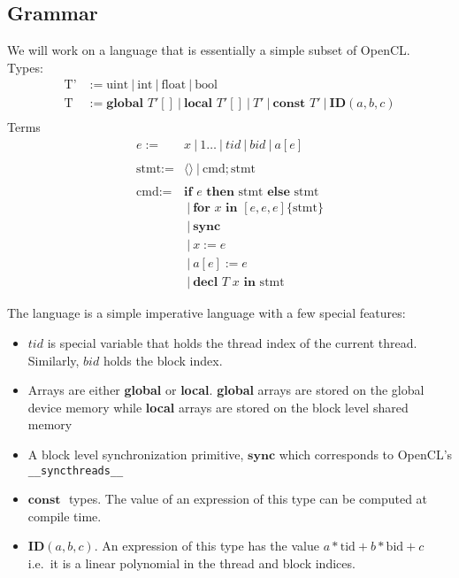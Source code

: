 \documentclass{article}
\newcommand{\nil}{\langle\rangle}
\newcommand{\Global}{\textbf{global }}
\newcommand{\local}{\textbf{local }}
\newcommand{\const}{\textbf{const }}
\newcommand{\id}[3]{\textbf{ID}(#1, #2, #3)}
\newcommand{\Ifte}[3]{\textbf{if } #1 \textbf{ then } #2 \textbf{ else } #3}
\newcommand{\for}[5]{\textbf{for } #1 \textbf{ in } [#2, #3, #4] \{#5\}}
\newcommand{\sync}{\textbf{sync}}
\newcommand{\decl}[3]{\textbf{decl } #1\; #2 \textbf{ in } #3}
\renewcommand{\|}{\:|\:}
\begin{document}
\subsection{Grammar}
We will work on a language that is essentially a simple subset of OpenCL.\\
Types:
  \begin{align*}
    \text{T'} &:=  \text{uint} \| \text{int} \| \text{float} \| \text{bool} \\
    \text{T} &:= \Global T' [] \| \local T' [] \| T' \| \const T' \| \id{a}{b}{c} \\
  \end{align*}
Terms
  \begin{align*}
    e := & x \| 1\ldots \| tid \| bid \| a[e] \\
     & \\
    \text{stmt} := & \nil \| \text{cmd}; \text{stmt}\\
     & \\
    \text{cmd} := & \Ifte{e}{\text{stmt}}{\text{stmt}} \\
                  & \| \for{x}{e}{e}{e}{\text{stmt}} \\
                  & \| \sync \\
                  & \| x := e \\
                  & \| a[e] := e \\
                  & \| \decl{T}{x}{\text{stmt}}
  \end{align*}

The language is a simple imperative language with a few special features:
\begin{itemize}
  \item $tid$ is special variable that holds the thread index of the current thread. Similarly, $bid$ holds the block index.
  \item Arrays are either \textbf{global} or \textbf{local}. \textbf{global} arrays are stored on the global device memory while \textbf{local} arrays are stored on the block level shared memory
  \item A block level synchronization primitive, $\sync$ which corresponds to OpenCL's \texttt{\_\_syncthreads\_\_}
  \item $\const$ types. The value of an expression of this type can be computed at compile time.
  \item $\id{a}{b}{c}$. An expression of this type has the value $a*\text{tid} + b*\text{bid} + c$ i.e.\ it is a linear polynomial in the thread and block indices.
\end{itemize}
\end{document}
